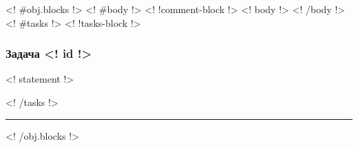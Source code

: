 \documentclass{article}
\begin{document}
    <! #obj.blocks !>
        <! #body !>     <! !comment-block !>
            <! body !>
        <! /body !>
        <! #tasks !>    <! !tasks-block !>
            \subsubsection*{Задача \textnumero <! id !>}
            <! statement !>

        <! /tasks !>
        
        \noindent\rule{\textwidth}{0.2pt}
    <! /obj.blocks !>
\end{document}
